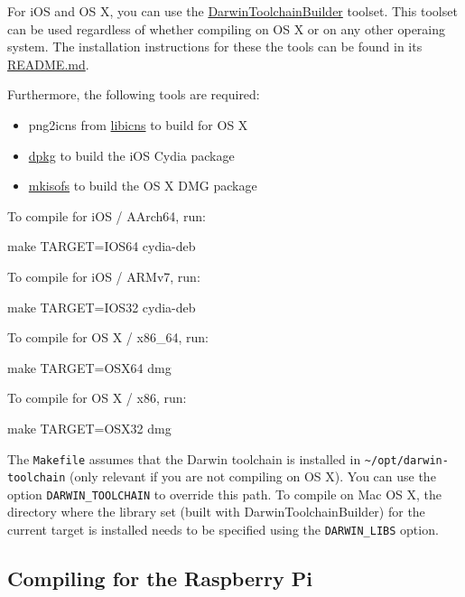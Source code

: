 For iOS and OS X, you can use the
\href{https://github.com/felixhaedicke/DarwinToolchainBuilder}{DarwinToolchainBuilder}
toolset. This toolset can be used regardless of whether compiling on OS X or on
any other operaing system. The installation instructions for these the tools
can be found in its
\href{https://github.com/felixhaedicke/DarwinToolchainBuilder/blob/master/README.md}{README.md}.

Furthermore, the following tools are required:
\begin{itemize}
\item png2icns from \href{http://icns.sourceforge.net}{libicns} to build for
  OS X
\item \href{https://alioth.debian.org/projects/dpkg}{dpkg} to build the iOS
  Cydia package
\item \href{http://cdrecord.org/private/cdrecord.html}{mkisofs} to build the
  OS X DMG package
\end{itemize}

To compile for iOS / AArch64, run:

\begin{verbatim*}
make TARGET=IOS64 cydia-deb
\end{verbatim*}

To compile for iOS / ARMv7, run:

\begin{verbatim*}
make TARGET=IOS32 cydia-deb
\end{verbatim*}

To compile for OS X / x86\_64, run:

\begin{verbatim*}
make TARGET=OSX64 dmg
\end{verbatim*}

To compile for OS X / x86, run:

\begin{verbatim*}
make TARGET=OSX32 dmg
\end{verbatim*}

The \texttt{Makefile} assumes that the Darwin toolchain is installed in
\verb|~/opt/darwin-toolchain| (only relevant if you are not compiling on OS X).
You can use the option \verb|DARWIN_TOOLCHAIN| to override this path.
To compile on Mac OS X, the directory where the library set (built with
DarwinToolchainBuilder) for the current target is installed needs to be
specified using the \verb|DARWIN_LIBS| option.

\subsection{Compiling for the Raspberry Pi}

